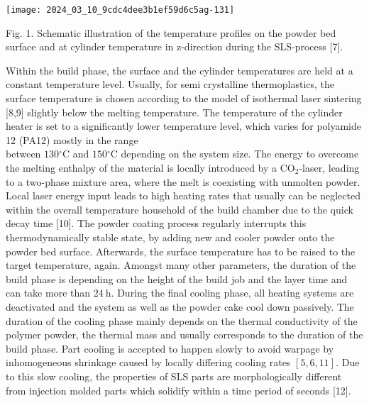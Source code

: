 \documentclass[10pt]{article}
\begin{document}
\begin{center}
\texttt{[image: 2024\_03\_10\_9cdc4dee3b1ef59d6c5ag-131]}
\end{center}

Fig. 1. Schematic illustration of the temperature profiles on the powder bed surface and at cylinder temperature in z-direction during the SLS-process [7].

Within the build phase, the surface and the cylinder temperatures are held at a constant temperature level. Usually, for semi crystalline thermoplastics, the surface temperature is chosen according to the model of isothermal laser sintering [8,9] slightly below the melting temperature. The temperature of the cylinder heater is set to a significantly lower temperature level, which varies for polyamide 12 (PA12) mostly in the range\\
between $130{ }^{\circ} \mathrm{C}$ and $150{ }^{\circ} \mathrm{C}$ depending on the system size. The energy to overcome the melting enthalpy of the material is locally introduced by a $\mathrm{CO}_{2}$-laser, leading to a two-phase mixture area, where the melt is coexisting with unmolten powder. Local laser energy input leads to high heating rates that usually can be neglected within the overall temperature household of the build chamber due to the quick decay time [10]. The powder coating process regularly interrupts this thermodynamically stable state, by adding new and cooler powder onto the powder bed surface. Afterwards, the surface temperature has to be raised to the target temperature, again. Amongst many other parameters, the duration of the build phase is depending on the height of the build job and the layer time and can take more than $24 \mathrm{~h}$. During the final cooling phase, all heating systems are deactivated and the system as well as the powder cake cool down passively. The duration of the cooling phase mainly depends on the thermal conductivity of the polymer powder, the thermal mass and usually corresponds to the duration of the build phase. Part cooling is accepted to happen slowly to avoid warpage by inhomogeneous shrinkage caused by locally differing cooling rates $[5,6,11]$. Due to this slow cooling, the properties of SLS parts are morphologically different from injection molded parts which solidify within a time period of seconds [12].
\end{document}
